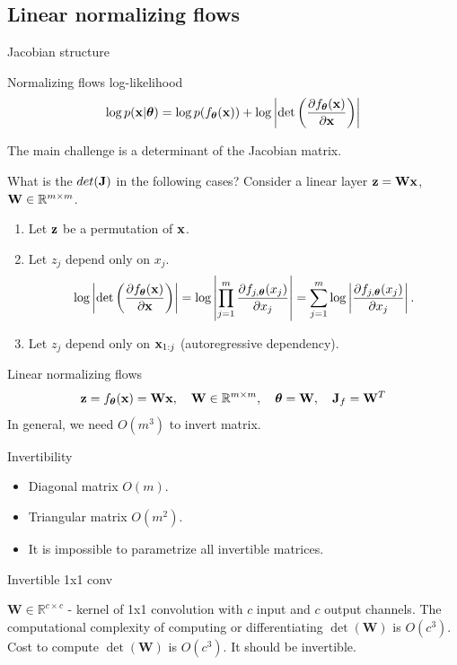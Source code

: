 \subsection{Linear normalizing flows}
\begin{frame}{Jacobian structure}
	\begin{block}{Normalizing flows log-likelihood}
		\[
			\log p(\mathbf{x}|\boldsymbol{\theta}) = \log p(f_{\boldsymbol{\theta}}(\mathbf{x})) + \log \left|\det \left( \frac{\partial f_{\boldsymbol{\theta}}(\mathbf{x})}{\partial \mathbf{x}} \right) \right|
		\]
	\end{block}
	The main challenge is a determinant of the Jacobian matrix.
	\begin{block}{What is the $det(\mathbf{J})$ in the following cases?}
		Consider a linear layer $\mathbf{z} = \mathbf{W} \mathbf{x}$, $\mathbf{W} \in \mathbb{R}^{m \times m}$.
		\begin{enumerate}
			\item Let $\mathbf{z}$ be a permutation of $\mathbf{x}$. 
			\item Let $z_j$ depend only on $x_j$. 
			\[
				\log \left|\det \left( \frac{\partial f_{\boldsymbol{\theta}}(\mathbf{x})}{\partial \mathbf{x}} \right) \right| = \log \left| \prod_{j=1}^m \frac{\partial f_{j, \boldsymbol{\theta}}(x_j)}{\partial x_j} \right| = \sum_{j=1}^m \log \left|  \frac{\partial f_{j, \boldsymbol{\theta}}(x_j)}{\partial x_j} \right|.
			\]
			\item Let $z_j$ depend only on $\mathbf{x}_{1:j}$ (autoregressive dependency). 
		\end{enumerate}
	\end{block}
\end{frame}
\begin{frame}{Linear normalizing flows}
	\[
		\mathbf{z} = f_{\boldsymbol{\theta}}(\mathbf{x}) = \mathbf{W} \mathbf{x}, \quad \mathbf{W} \in \mathbb{R}^{m \times m}, \quad \boldsymbol{\theta} = \mathbf{W}, \quad \mathbf{J}_f = \mathbf{W}^T
	\]
	In general, we need $O(m^3)$ to invert matrix.
	\begin{block}{Invertibility}
		\begin{itemize}
			\item Diagonal matrix $O(m)$.
			\item Triangular matrix $O(m^2)$.
			\item It is impossible to parametrize all invertible matrices.
		\end{itemize}
	\end{block}
	\begin{block}{Invertible 1x1 conv}
			
		$\mathbf{W} \in \mathbb{R}^{c \times c}$ - kernel of 1x1 convolution with $c$ input and $c$ output channels.
		The computational complexity of computing or differentiating $\det (\mathbf{W})$ is $O(c^3)$.
		Cost to compute $\det (\mathbf{W})$ is $O(c^3)$. It should be invertible.
	\end{block}
	
\end{frame}
